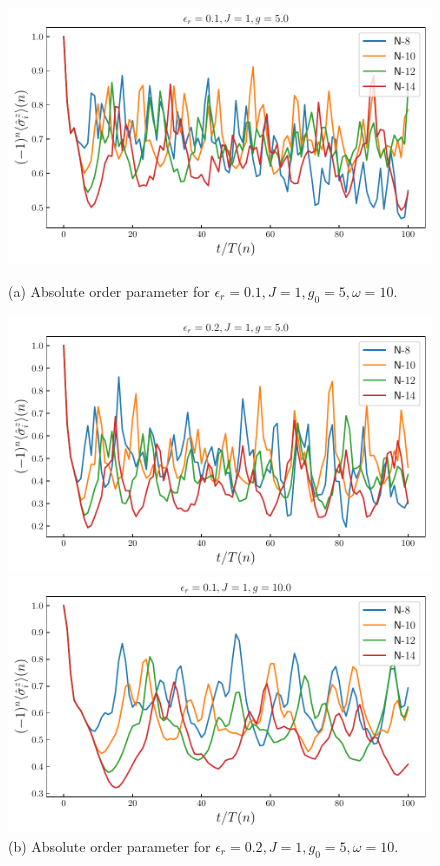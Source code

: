 \documentclass[a4paper, 11pt]{article}
\begin{document}
\newpage
\begin{figure}[h!]
    \centering
    \begin{minipage}[t]{0.48\textwidth}
        \centering
        \includegraphics[width=\textwidth]{figs/order_er0.1_J1_g5.0.pdf}
        \caption*{(a) Absolute order parameter for $\epsilon_r = 0.1, J = 1, g_0 = 5, \omega = 10$.}
    \end{minipage}
    \hfill
    \begin{minipage}[t]{0.48\textwidth}
        \centering
        \includegraphics[width=\textwidth]{figs/order_er0.2_J1_g5.0.pdf}
        \caption*{(b) Absolute order parameter for $\epsilon_r = 0.2, J = 1, g_0 = 5, \omega = 10$.}
    \end{minipage}
    \vfill
    \begin{minipage}[t]{0.48\textwidth}
        \centering
        \includegraphics[width=\textwidth]{figs/order_er0.1_J1_g10.0.pdf}

\end{minipage}
\end{figure}
\end{document}
